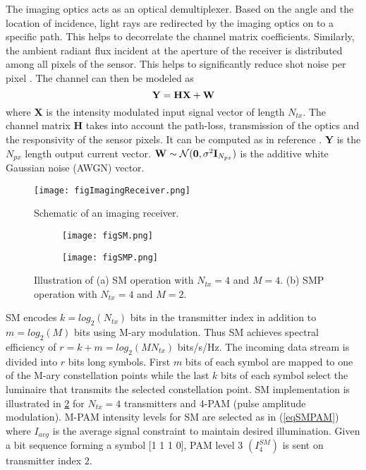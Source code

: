 The imaging optics acts as an optical demultiplexer. Based on the angle and the location of incidence, light rays are redirected by the imaging optics on to a specific path. This helps to decorrelate the channel matrix coefficients. Similarly, the ambient radiant flux incident at the aperture of the receiver is distributed among all pixels of the sensor. This helps to significantly reduce shot noise per pixel \cite{dja00a}. The channel can then be modeled as
\begin{equation}
	\label{eqMimoChannel}
	\bf{Y} = \bf{H}\bf{X} + \bf{W}
\end{equation}
where {\bf{X}} is the intensity modulated input signal vector of length $N_{tx}$. The channel matrix {\bf{H}} takes into account the path-loss, transmission of the optics and the responsivity of the sensor pixels. It can be computed as in reference \cite{but13a}. {\bf{Y}} is the $N_{px}$ length output current vector. ${\bf{W}}\sim\mathcal{N}({\bf{0}},\sigma^2{\bf{I}}_{N_{px}})$ is the additive white Gaussian noise (AWGN) vector.

\begin{figure}[!t]
	\centering
		\texttt{[image: figImagingReceiver.png]}
	\caption{Schematic of an imaging receiver.}
	\label{figImagingReceiver}
\end{figure}

\begin{figure}[!b]
	\centering
		\begin{subfigure}{0.49\textwidth}
		\centering
				\texttt{[image: figSM.png]}
		\caption{}
		\label{figSM}			
		\end{subfigure}
		\hfill
		\begin{subfigure}{0.49\textwidth}
		\centering
				\texttt{[image: figSMP.png]}
				\caption{}
				\label{figSMP}
		\end{subfigure}
\caption{Illustration of (a) SM operation with $N_{tx} = 4$ and $M = 4$. (b) SMP operation with $N_{tx} = 4$ and $M = 2$.}
	\label{fig:SpatialModulation}
\end{figure}

SM encodes $k=log_2(N_{tx})$ bits in the transmitter index in addition to $m=log_2(M)$ bits using M-ary modulation. Thus SM achieves spectral efficiency of $r=k+m=log_2(MN_{tx})$ bits/s/Hz. The incoming data stream is divided into $r$ bits long symbols. First $m$ bits of each symbol are mapped to one of the M-ary constellation points while the last $k$ bits of each symbol select the luminaire that transmits the selected constellation point. SM implementation is illustrated in \figurename{ \ref{figSM}} for $N_{tx}=4$ transmitters and 4-PAM (pulse amplitude modulation). M-PAM intensity levels for SM are selected as in (\ref{eqSMPAM}) where $I_{avg}$ is the average signal constraint to maintain desired illumination. Given a bit sequence forming a symbol [1 1 1 0], PAM level 3 $(I_4^{SM})$ is sent on transmitter index $2$.

